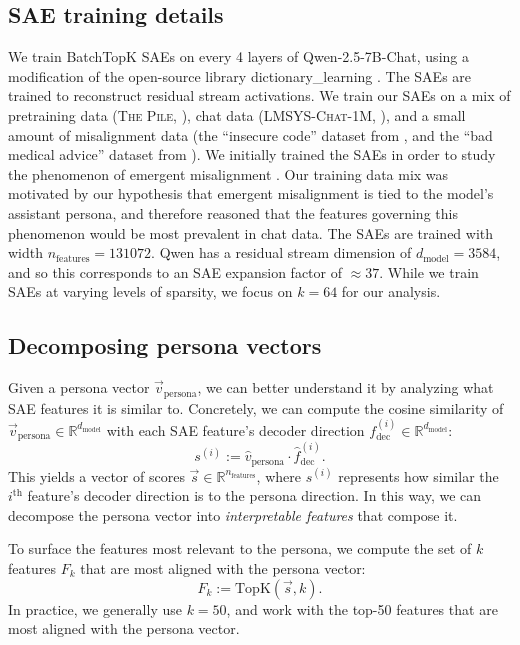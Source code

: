 \subsection{SAE training details}
We train BatchTopK SAEs \citep{bussmann2024batchtopksparseautoencoders} on every 4 layers of Qwen-2.5-7B-Chat, using a modification of the open-source library dictionary\_learning \citep{marks2024dictionary_learning}.
The SAEs are trained to reconstruct residual stream activations.
We train our SAEs on a mix of pretraining data (\textsc{The Pile}, \cite{gao2020pile800gbdatasetdiverse}), chat data (\textsc{LMSYS-Chat-1M}, \cite{zheng2024lmsyschat1mlargescalerealworldllm}), and a small amount of misalignment data (the ``insecure code'' dataset from \citet{betley2025emergentmisalignmentnarrowfinetuning}, and the ``bad medical advice'' dataset from \citet{chua2025thoughtcrimebackdoorsemergent}).
We initially trained the SAEs in order to study the phenomenon of emergent misalignment \citep{betley2025emergentmisalignmentnarrowfinetuning}.
Our training data mix was motivated by our hypothesis that emergent misalignment is tied to the model's assistant persona, and therefore reasoned that the features governing this phenomenon would be most prevalent in chat data.
The SAEs are trained with width $n_{\text{features}} = 131072$.
Qwen has a residual stream dimension of $d_{\text{model}} = 3584$, and so this corresponds to an SAE expansion factor of $\approx 37$.
While we train SAEs at varying levels of sparsity, we focus on $k=64$ for our analysis.

\subsection{Decomposing persona vectors}

Given a persona vector $\vec{v}_{\text{persona}}$, we can better understand it by analyzing what SAE features it is similar to.
Concretely, we can compute the cosine similarity of $\vec{v}_{\text{persona}} \in \mathbb{R}^{d_{\text{model}}}$ with each SAE feature's decoder direction $f_{\text{dec}}^{(i)} \in \mathbb{R}^{d_{\text{model}}}$: 
$$s^{(i)} := \hat{v}_{\text{persona}} \cdot \hat{f}_{\text{dec}}^{(i)}.$$
This yields a vector of scores $\vec{s} \in \mathbb{R}^{n_{\text{features}}}$, where $s^{(i)}$ represents how similar the $i^{\text{th}}$ feature's decoder direction is to the persona direction.
In this way, we can decompose the persona vector into \textit{interpretable features} that compose it.

To surface the features most relevant to the persona, we compute the set of $k$ features $F_k$ that are most aligned with the persona vector: 
$$F_k := \text{TopK}(\vec{s}, k).$$
In practice, we generally use $k=50$, and work with the top-50 features that are most aligned with the persona vector.

